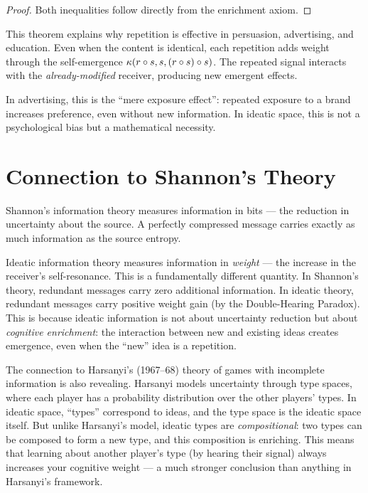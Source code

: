 \begin{proof}
Both inequalities follow directly from the enrichment axiom.
\end{proof}

\begin{interpretation}
This theorem explains why repetition is effective in persuasion, advertising, and education. Even when the content is identical, each repetition adds weight through the self-emergence $\kappa(r \circ s, s, (r \circ s) \circ s)$. The repeated signal interacts with the \emph{already-modified} receiver, producing new emergent effects.

In advertising, this is the ``mere exposure effect'': repeated exposure to a brand increases preference, even without new information. In ideatic space, this is not a psychological bias but a mathematical necessity.
\end{interpretation}

\section{Connection to Shannon's Theory}

Shannon's information theory measures information in bits --- the reduction in uncertainty about the source. A perfectly compressed message carries exactly as much information as the source entropy.

Ideatic information theory measures information in \emph{weight} --- the increase in the receiver's self-resonance. This is a fundamentally different quantity. In Shannon's theory, redundant messages carry zero additional information. In ideatic theory, redundant messages carry positive weight gain (by the Double-Hearing Paradox). This is because ideatic information is not about uncertainty reduction but about \emph{cognitive enrichment}: the interaction between new and existing ideas creates emergence, even when the ``new'' idea is a repetition.

The connection to Harsanyi's (1967--68) theory of games with incomplete information is also revealing. Harsanyi models uncertainty through type spaces, where each player has a probability distribution over the other players' types. In ideatic space, ``types'' correspond to ideas, and the type space is the ideatic space itself. But unlike Harsanyi's model, ideatic types are \emph{compositional}: two types can be composed to form a new type, and this composition is enriching. This means that learning about another player's type (by hearing their signal) always increases your cognitive weight --- a much stronger conclusion than anything in Harsanyi's framework.


